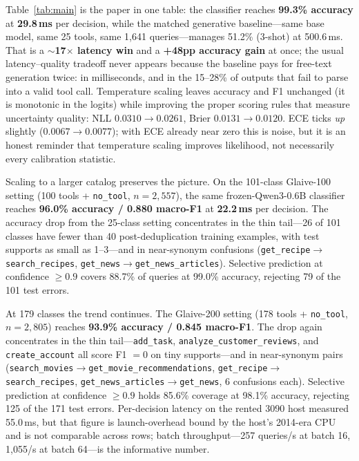 \documentclass{article}
\begin{document}
Table~\ref{tab:main} is the paper in one table: the classifier reaches
\textbf{99.3\% accuracy} at \textbf{29.8\,ms} per decision, while the matched
generative baseline---same base model, same 25 tools, same 1,641 queries---manages
51.2\% (3-shot) at 500.6\,ms. That is a \textbf{$\sim$17$\times$ latency win}
and a \textbf{+48pp accuracy gain} at once; the usual latency--quality tradeoff
never appears because the baseline pays for free-text generation twice: in
milliseconds, and in the 15--28\% of outputs that fail to parse into a valid
tool call. Temperature scaling leaves accuracy and
F1 unchanged (it is monotonic in the logits) while improving the proper
scoring rules that measure uncertainty quality: NLL $0.0310 \to 0.0261$,
Brier $0.0131 \to 0.0120$. ECE ticks \emph{up} slightly ($0.0067 \to
0.0077$); with ECE already near zero this is noise, but it is an honest
reminder that temperature scaling improves likelihood, not necessarily every
calibration statistic.

Scaling to a larger catalog preserves the picture. On the 101-class
Glaive-100 setting (100 tools + \texttt{no\_tool}, $n=2{,}557$), the same
frozen-Qwen3-0.6B classifier reaches \textbf{96.0\% accuracy / 0.880 macro-F1}
at \textbf{22.2\,ms} per decision. The accuracy drop from the 25-class setting
concentrates in the thin tail---26 of 101 classes have fewer than 40
post-deduplication training examples, with test supports as small as 1--3---and
in near-synonym confusions (\texttt{get\_recipe}$\to$\texttt{search\_recipes},
\texttt{get\_news}$\to$\texttt{get\_news\_articles}). Selective prediction at
confidence $\ge 0.9$ covers 88.7\% of queries at 99.0\% accuracy, rejecting
79 of the 101 test errors.

At 179 classes the trend continues. The Glaive-200 setting (178 tools +
\texttt{no\_tool}, $n=2{,}805$) reaches \textbf{93.9\% accuracy / 0.845
macro-F1}. The drop again concentrates in the thin tail---\texttt{add\_task},
\texttt{analyze\_customer\_reviews}, and \texttt{create\_account} all score
F1 $=0$ on tiny supports---and in near-synonym pairs
(\texttt{search\_movies}$\to$\texttt{get\_movie\_recommendations},
\texttt{get\_recipe}$\to$\texttt{search\_recipes},
\texttt{get\_news\_articles}$\to$\texttt{get\_news}, 6 confusions each).
Selective prediction at confidence $\ge 0.9$ holds 85.6\% coverage at 98.1\%
accuracy, rejecting 125 of the 171 test errors. Per-decision latency on the
rented 3090 host measured 55.0\,ms, but that figure is launch-overhead bound
by the host's 2014-era CPU and is not comparable across rows; batch
throughput---257 queries/s at batch 16, 1{,}055/s at batch 64---is the
informative number.
\end{document}
